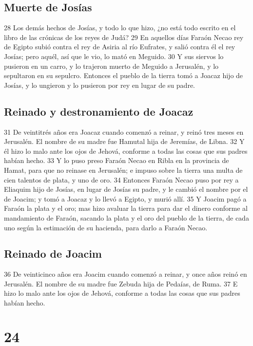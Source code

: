 \section*{Muerte de Josías}

28 Los demás hechos de Josías, y todo lo que hizo, ¿no está todo escrito en el libro de las crónicas de los reyes de Judá?
29 En aquellos días Faraón Necao rey de Egipto subió contra el rey de Asiria al río Eufrates, y salió contra él el rey Josías; pero aquél, así que le vio, lo mató en Meguido.
30 Y sus siervos lo pusieron en un carro, y lo trajeron muerto de Meguido a Jerusalén, y lo sepultaron en su sepulcro. Entonces el pueblo de la tierra tomó a Joacaz hijo de Josías, y lo ungieron y lo pusieron por rey en lugar de su padre.
\section*{Reinado y destronamiento de Joacaz}

 
31 De veintitrés años era Joacaz cuando comenzó a reinar, y reinó tres meses en Jerusalén. El nombre de su madre fue Hamutal hija de Jeremías, de Libna.
32 Y él hizo lo malo ante los ojos de Jehová, conforme a todas las cosas que sus padres habían hecho.
33 Y lo puso preso Faraón Necao en Ribla en la provincia de Hamat, para que no reinase en Jerusalén; e impuso sobre la tierra una multa de cien talentos de plata,  y uno de oro.
34 Entonces Faraón Necao puso por rey a Eliaquim hijo de Josías, en lugar de Josías su padre, y le cambió el nombre por el de Joacim; y tomó a Joacaz y lo llevó a Egipto, y murió allí. 
35 Y Joacim pagó a Faraón la plata y el oro; mas hizo avaluar la tierra para dar el dinero conforme al mandamiento de Faraón, sacando la plata y el oro del pueblo de la tierra, de cada uno según la estimación de su hacienda, para darlo a Faraón Necao.
\section*{Reinado de Joacim}

 
36 De veinticinco años era Joacim cuando comenzó a reinar, y once años reinó en Jerusalén. El nombre de su madre fue Zebuda hija de Pedaías, de Ruma.
37 E hizo lo malo ante los ojos de Jehová, conforme a todas las cosas que sus padres habían hecho.

\chapter{24}


